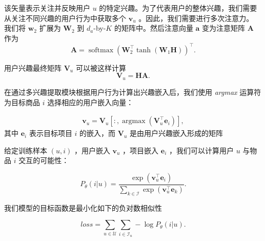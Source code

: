 该矢量表示关注并反映用户 $u$ 的特定兴趣。为了代表用户的整体兴趣，我们需要从关注不同兴趣的用户行为中获取多个 $\mathbf{v}_u$ 。因此，我们需要进行多次注意力。 我们将 $\mathbf{w}_{2}$ 扩展为 $\mathbf{W}_{2}$ 到 $d_a$-by-$K$ 的矩阵中。然后注意向量 $\mathbf{a}$ 变为注意矩阵 $\mathbf{A}$ 作为
\begin{equation}
    \mathbf{A} = \operatorname{softmax}(\mathbf{W}_{2}^\top \operatorname{tanh}(\mathbf{W}_{1} \mathbf{H}))^\top.
\end{equation}

用户兴趣最终矩阵 $\mathbf{V}_u$ 可以被这样计算
\begin{equation}
    \label{eqn:sa}
    \mathbf{V}_u = \mathbf{H} \mathbf{A}.
\end{equation}



在通过多兴趣提取模块根据用户行为计算出兴趣嵌入后，我们使用 \textit{argmax} 运算符为目标商品 $i$ 选择相应的用户嵌入向量：

\begin{equation}
    \label{eqn:argmax}
    \begin{aligned}
        \mathbf{v}_u = \mathbf{V}_u[:, \operatorname{argmax}(\mathbf{V}_u^\top \mathbf{e}_i)],
    \end{aligned}
\end{equation}
其中 $\mathbf{e}_i$ 表示目标项目 $i$ 的嵌入，而 $\mathbf{V}_u$ 是由用户兴趣嵌入形成的矩阵 %

给定训练样本 $(u,i)$ ，用户嵌入 $\mathbf{v}_u$ ，项目嵌入 $\mathbf{e}_i$ ，我们可以计算用户 $u$ 与物品 $i$ 交互的可能性：

\begin{equation}
    \label{eqn:likelihood}
    P_\theta(i|u) = \frac{\exp(\mathbf{v}_u^\top \mathbf{e}_i)}{\sum_{k\in\mathcal{I}}\exp(\mathbf{v}_u^\top \mathbf{e}_k)}.
\end{equation}

我们模型的目标函数是最小化如下的负对数相似性

\begin{equation}
    \label{eqn:loss}
    loss = \sum_{u\in \mathcal{U}} \sum_{i\in \mathcal{I}_u} -\log P_\theta(i|u).
\end{equation}

